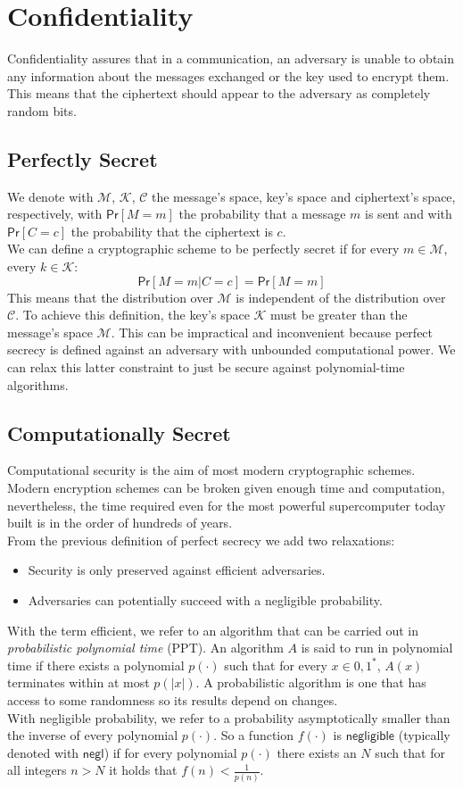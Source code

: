 \section{Confidentiality}
Confidentiality assures that in a communication, an adversary is unable to obtain any information about the messages exchanged or the key used to encrypt them. This means that the ciphertext should appear to the adversary as completely random bits.
\subsection{Perfectly Secret}
We denote with $\mathcal{M}$, $\mathcal{K}$, $\mathcal{C}$ the message's space, key's space and ciphertext's space, respectively,  with $\mathsf{Pr}[M = m]$ the probability that a message $m$ is sent and with $\mathsf{Pr}[C = c]$ the probability that the ciphertext is $c$.\\
We can define a cryptographic scheme to be perfectly secret if for every $m \in \mathcal{M}$, every $k \in \mathcal{K}$:
$$
    \mathsf{Pr}[M = m | C = c] = \mathsf{Pr}[M = m]
$$
This means that the distribution over $\mathcal{M}$ is independent of the distribution over $\mathcal{C}$.
To achieve this definition, the key's space $\mathcal{K}$ must be greater than the message's space $\mathcal{M}$. This can be impractical and inconvenient because perfect secrecy is defined against an adversary with unbounded computational power. We can relax this latter constraint to just be secure against polynomial-time algorithms.

\subsection{Computationally Secret}
Computational security is the aim of most modern cryptographic schemes. Modern encryption schemes can be broken given enough time and computation, nevertheless, the time required even for the most powerful supercomputer today built is in the order of hundreds of years.\\
From the previous definition of perfect secrecy we add two relaxations:
\begin{itemize}
    \item{Security is only preserved against efficient adversaries.}
    \item{Adversaries can potentially succeed with a negligible probability.}
\end{itemize}
With the term efficient, we refer to an algorithm that can be carried out in \emph{probabilistic polynomial time} (PPT). An algorithm $\mathit{A}$ is said to run in polynomial time if there exists a polynomial $p(\cdot)$ such that for every $x \in {0, 1}^*$, $\mathit{A}(x)$ terminates within at most $p(|x|)$. A probabilistic algorithm is one that has access to some randomness so its results depend on changes.\\
With negligible probability, we refer to a probability asymptotically smaller than the inverse of every polynomial $p(\cdot)$.
So a function $f(\cdot)$ is $\mathsf{negligible}$ (typically denoted with $\mathsf{negl}$) if for every polynomial $p(\cdot)$ there exists an $N$ such that for all integers $n > N$ it holds that $f(n) < \frac{1}{p(n)}$.

